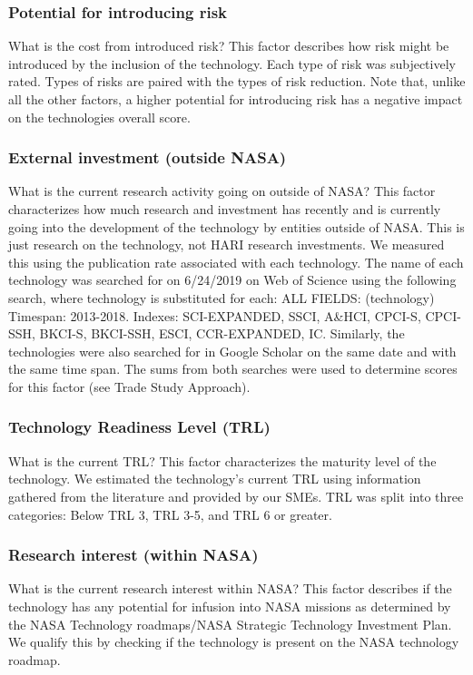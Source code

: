 \subsubsection{Potential for introducing risk}
What is the cost from introduced risk? This factor describes how risk might be introduced by the inclusion of the technology.
Each type of risk was subjectively rated.
Types of risks are paired with the types of risk reduction.
Note that, unlike all the other factors, a higher potential for introducing risk has a negative impact on the technologies overall score.

\subsubsection{External investment (outside NASA)}
What is the current research activity going on outside of NASA? This factor characterizes how much research and investment has recently and is currently going into the development of the technology by entities outside of NASA.
This is just research on the technology, not HARI research investments.
We measured this using the publication rate associated with each technology.
The name of each technology was searched for on 6/24/2019 on Web of Science using the following search, where technology is substituted for each:
	ALL FIELDS: (technology)
    Timespan: 2013-2018.
    Indexes: SCI-EXPANDED, SSCI, A\&HCI, CPCI-S, CPCI-SSH, BKCI-S, BKCI-SSH, ESCI, CCR-EXPANDED, IC.
Similarly, the technologies were also searched for in Google Scholar on the same date and with the same time span.
The sums from both searches were used to determine scores for this factor (see Trade Study Approach).

\subsubsection{Technology Readiness Level (TRL)}
What is the current TRL? This factor characterizes the maturity level of the technology.
We estimated the technology's current TRL using information gathered from the literature and provided by our SMEs.
TRL was split into three categories: Below TRL 3, TRL 3-5, and TRL 6 or greater.

\subsubsection{Research interest (within NASA)}
What is the current research interest within NASA? This factor describes if the technology has any potential for infusion into NASA missions as determined by the NASA Technology roadmaps/NASA Strategic Technology Investment Plan.
We qualify this by checking if the technology is present on the NASA technology roadmap.

